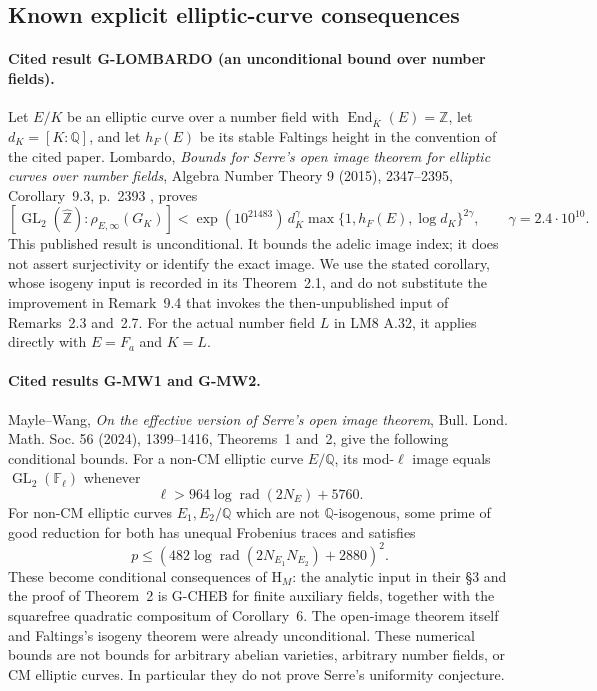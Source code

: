 \documentclass[11pt,a4paper]{article}
\begin{document}
\subsection{Known explicit elliptic-curve consequences}

\paragraph{Cited result G-LOMBARDO (an unconditional bound over number fields).}
Let $E/K$ be an elliptic curve over a number field with
$\operatorname{End}_{\overline K}(E)=\mathbb Z$, let $d_K=[K:\mathbb Q]$,
and let $h_F(E)$ be its stable Faltings height in the convention of the
cited paper.  Lombardo, \emph{Bounds for Serre's open image theorem for
elliptic curves over number fields}, Algebra Number Theory 9 (2015),
2347--2395, Corollary~9.3, p.~2393 \cite{Lombardo2015}, proves
\[
 [\operatorname{GL}_2(\widehat{\mathbb Z}):\rho_{E,\infty}(G_K)]
 < \exp(10^{21483})\,d_K^{\gamma}
       \max\{1,h_F(E),\log d_K\}^{2\gamma},
 \qquad \gamma=2.4\cdot10^{10}. \tag{G-LOMBARDO}
\]
This published result is unconditional. It bounds the adelic image index;
it does not assert surjectivity or identify the exact image. We use the
stated corollary, whose isogeny input is recorded in its Theorem~2.1,
and do not substitute the improvement in Remark~9.4 that invokes the
then-unpublished input of Remarks~2.3 and~2.7. For the actual number
field $L$ in LM8 A.32, it applies directly with $E=F_a$ and $K=L$.

\paragraph{Cited results G-MW1 and G-MW2.}
Mayle--Wang, \emph{On the effective version of Serre's open image theorem}, Bull. Lond. Math. Soc. 56 (2024), 1399--1416, Theorems~1 and~2, give the following conditional bounds. For a non-CM elliptic curve $E/\mathbb Q$, its mod-$\ell$ image equals $\operatorname{GL}_2(\mathbb F_\ell)$ whenever
\[
 \ell>964\log\operatorname{rad}(2N_E)+5760.
 \tag{G-MW1}
\]
For non-CM elliptic curves $E_1,E_2/\mathbb Q$ which are not $\mathbb Q$-isogenous, some prime of good reduction for both has unequal Frobenius traces and satisfies
\[
 p\le\left(482\log\operatorname{rad}(2N_{E_1}N_{E_2})+2880\right)^2.
 \tag{G-MW2}
\]
These become conditional consequences of $\mathrm{H}_M$: the analytic input in their \S3 and the proof of Theorem~2 is G-CHEB for finite auxiliary fields, together with the squarefree quadratic compositum of Corollary~6. The open-image theorem itself and Faltings's isogeny theorem were already unconditional. These numerical bounds are not bounds for arbitrary abelian varieties, arbitrary number fields, or CM elliptic curves. In particular they do not prove Serre's uniformity conjecture.
\end{document}
